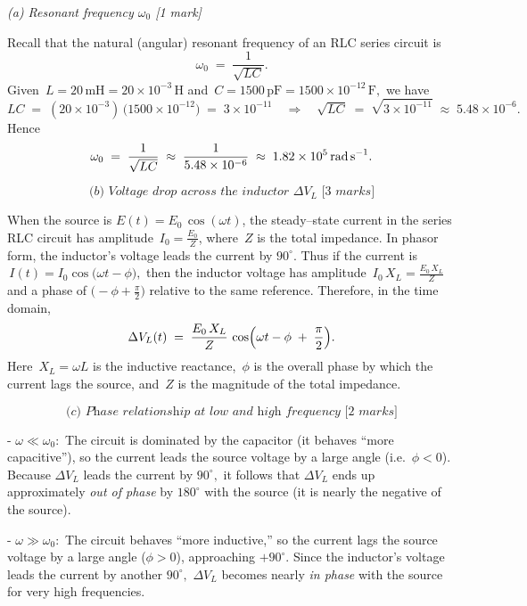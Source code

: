 \documentclass{article}
\begin{document}
\textit{(a) Resonant frequency \(\omega_0\) [1 mark]}

Recall that the natural (angular) resonant frequency of an RLC series circuit is 
\[
\omega_0 \;=\; \frac{1}{\sqrt{LC}}.
\]
Given 
\(\,L=20\,\text{mH} = 20\times10^{-3}\,\text{H}\)
and 
\(\,C=1500\,\text{pF} = 1500\times10^{-12}\,\text{F},\)
we have 
\[
LC \;=\; (20\times10^{-3})\,\bigl(1500\times10^{-12}\bigr)
       \;=\; 3\times10^{-11}
\quad\Longrightarrow\quad
\sqrt{LC}\;=\;\sqrt{3\times10^{-11}}
           \;\approx\;5.48\times10^{-6}.
\]
Hence
\[
\omega_0 \;=\;\frac{1}{\sqrt{LC}}
           \;\approx\;\frac{1}{5.48\times10^{-6}}
           \;\approx\;1.82\times10^{5}\,\text{rad\,s}^{-1}.
\]

\[
\textit{(b) Voltage drop across the inductor \(\Delta V_L\) [3 marks]}
\]

When the source is 
\(\displaystyle E(t) = E_0\,\cos(\omega t)\),
the steady--state current in the series RLC circuit has amplitude 
\(\,I_0 = \tfrac{E_0}{Z}\),
where 
\(\,Z\) is the total impedance.  
In phasor form,
the inductor's voltage leads the current by \(90^\circ\).  
Thus if the current is 
\(\,I(t) = I_0\cos\bigl(\omega t - \phi\bigr),\)
then the inductor voltage has amplitude
\(\,I_0\,X_L = \tfrac{E_0\,X_L}{Z}\)
and a phase of 
\(\bigl(-\phi + \tfrac{\pi}{2}\bigr)\)
relative to the same reference.  
Therefore, in the time domain,
\[
\Delta V_{L}(t)
\;=\;\frac{E_0\,X_L}{Z}
\,\cos\Bigl(\omega t - \phi \;+\;\frac{\pi}{2}\Bigr).
\]
Here 
\(\,X_L = \omega L\)
is the inductive reactance, 
\(\,\phi\) is the overall phase by which the current lags the source, 
and 
\(\,Z\)
is the magnitude of the total impedance.

\[
\textit{(c) Phase relationship at low and high frequency [2 marks]}
\]

- \(\omega \ll \omega_0:\)
  The circuit is dominated by the capacitor (it behaves ``more capacitive''), so 
  the current leads the source voltage by a large angle 
  (i.e.\ \(\phi<0\)).  
  Because \(\Delta V_L\) leads the current by \(90^\circ,\) it follows that 
  \(\Delta V_L\) ends up approximately \emph{out of phase} by \(180^\circ\) 
  with the source (it is nearly the negative of the source).

- \(\omega \gg \omega_0:\)
  The circuit behaves ``more inductive,'' so the current lags the source voltage 
  by a large angle (\(\phi>0\)), approaching \(+90^\circ\). 
  Since the inductor's voltage leads the current by another \(90^\circ,\) 
  \(\Delta V_L\) becomes nearly \emph{in phase} with the source 
  for very high frequencies.
\end{document}
